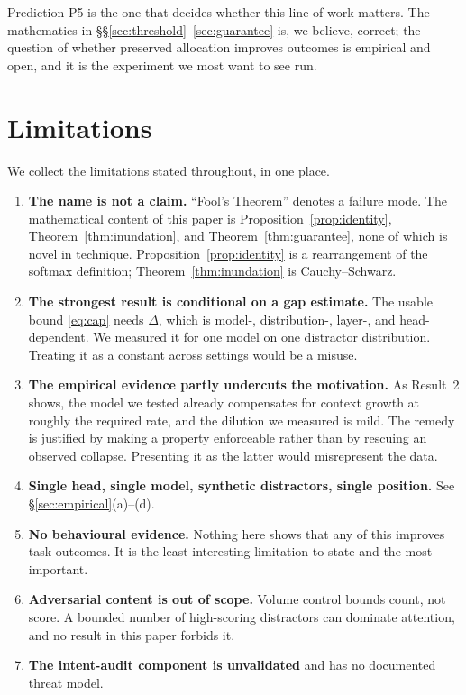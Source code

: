 \documentclass[11pt,a4paper]{article}
\theoremstyle{plain}
\theoremstyle{definition}
\theoremstyle{remark}
\begin{document}
Prediction P5 is the one that decides whether this line of work matters. The
mathematics in \S\S\ref{sec:threshold}--\ref{sec:guarantee} is, we believe,
correct; the question of whether preserved allocation improves outcomes is
empirical and open, and it is the experiment we most want to see run.

\section{Limitations}
\label{sec:limits}

We collect the limitations stated throughout, in one place.

\begin{enumerate}[label=(\arabic*), leftmargin=*]
  \item \textbf{The name is not a claim.} ``Fool's Theorem'' denotes a failure
        mode. The mathematical content of this paper is
        Proposition~\ref{prop:identity}, Theorem~\ref{thm:inundation}, and
        Theorem~\ref{thm:guarantee}, none of which is novel in technique.
        Proposition~\ref{prop:identity} is a rearrangement of the softmax
        definition; Theorem~\ref{thm:inundation} is Cauchy--Schwarz.

  \item \textbf{The strongest result is conditional on a gap estimate.} The
        usable bound \eqref{eq:cap} needs $\Delta$, which is model-,
        distribution-, layer-, and head-dependent. We measured it for one model
        on one distractor distribution. Treating it as a constant across
        settings would be a misuse.

  \item \textbf{The empirical evidence partly undercuts the motivation.} As
        Result~2 shows, the model we tested already compensates for context
        growth at roughly the required rate, and the dilution we measured is
        mild. The remedy is justified by making a property enforceable rather
        than by rescuing an observed collapse. Presenting it as the latter would
        misrepresent the data.

  \item \textbf{Single head, single model, synthetic distractors, single
        position.} See \S\ref{sec:empirical}(a)--(d).

  \item \textbf{No behavioural evidence.} Nothing here shows that any of this
        improves task outcomes. It is the least interesting limitation to state
        and the most important.

  \item \textbf{Adversarial content is out of scope.} Volume control bounds
        count, not score. A bounded number of high-scoring distractors can
        dominate attention, and no result in this paper forbids it.

  \item \textbf{The intent-audit component is unvalidated} and has no
        documented threat model.
\end{enumerate}
\end{document}
